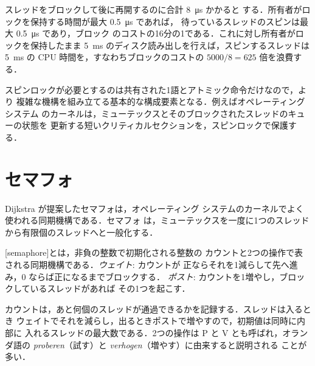 \documentclass[../main.tex]{subfiles}
\begin{document}
\begin{example}
  スレッドをブロックして後に再開するのに合計 \SI{8}{\micro\second} かかると
  する．所有者がロックを保持する時間が最大 \SI{0.5}{\micro\second} であれば，
  待っているスレッドのスピンは最大 \SI{0.5}{\micro\second} であり，ブロック
  のコストの16分の1である．これに対し所有者がロックを保持したまま
  \SI{5}{\milli\second} のディスク読み出しを行えば，スピンするスレッドは
  \SI{5}{\milli\second} の CPU 時間を，すなわちブロックのコストの
  $5000/8 = 625$ 倍を浪費する．
\end{example}

スピンロックが必要とするのは共有された1語とアトミック命令だけなので，より
複雑な機構を組み立てる基本的な構成要素となる．例えばオペレーティングシステム
のカーネルは，ミューテックスとそのブロックされたスレッドのキューの状態を
更新する短いクリティカルセクションを，スピンロックで保護する．

\section{セマフォ}
\label{sec:l10-semaphore}

Dijkstra \cite{dijkstra1965} が提案したセマフォは，オペレーティング
システムのカーネルでよく使われる同期機構である．セマフォ
は，ミューテックスを一度に1つのスレッドから有限個のスレッドへと一般化する．

\begin{definition}[セマフォ]
  [semaphore]とは，非負の整数で初期化される整数の
  カウントと2つの操作で表される同期機構である．\emph{ウェイト}: カウントが
  正ならそれを1減らして先へ進み，0 ならば正になるまでブロックする．
  \emph{ポスト}: カウントを1増やし，ブロックしているスレッドがあれば
  その1つを起こす．
\end{definition}

カウントは，あと何個のスレッドが通過できるかを記録する．スレッドは入るとき
ウェイトでそれを減らし，出るときポストで増やすので，初期値は同時に内部に
入れるスレッドの最大数である．2つの操作は P と V とも呼ばれ，オランダ語の
\emph{proberen}（試す）と \emph{verhogen}（増やす）に由来すると説明される
ことが多い．
\end{document}
